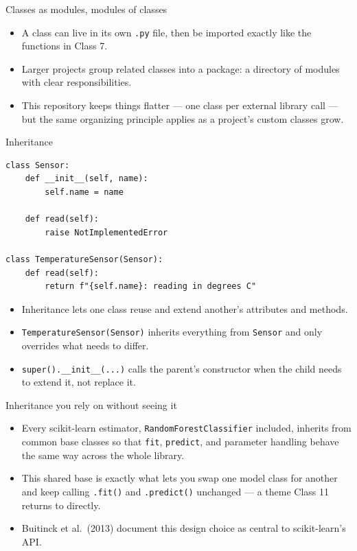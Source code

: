 \begin{frame}{Classes as modules, modules of classes}
\begin{itemize}
\item A class can live in its own \texttt{.py} file, then be imported exactly like the functions in Class 7.
\item Larger projects group related classes into a package: a directory of modules with clear responsibilities.
\item This repository keeps things flatter --- one class per external library call --- but the same organizing principle applies as a project's custom classes grow.
\end{itemize}
\coursefooter
\end{frame}

\begin{frame}[fragile]{Inheritance}
\begin{lstlisting}[style=coursepython]
class Sensor:
    def __init__(self, name):
        self.name = name

    def read(self):
        raise NotImplementedError

class TemperatureSensor(Sensor):
    def read(self):
        return f"{self.name}: reading in degrees C"
\end{lstlisting}
\begin{itemize}
\item Inheritance lets one class reuse and extend another's attributes and methods.
\item \texttt{TemperatureSensor(Sensor)} inherits everything from \texttt{Sensor} and only overrides what needs to differ.
\item \texttt{super().\_\_init\_\_(...)} calls the parent's constructor when the child needs to extend it, not replace it.
\end{itemize}
\coursefooter
\end{frame}

\begin{frame}{Inheritance you rely on without seeing it}
\begin{itemize}
\item Every scikit-learn estimator, \texttt{RandomForestClassifier} included, inherits from common base classes so that \texttt{fit}, \texttt{predict}, and parameter handling behave the same way across the whole library.
\item This shared base is exactly what lets you swap one model class for another and keep calling \texttt{.fit()} and \texttt{.predict()} unchanged --- a theme Class 11 returns to directly.
\item Buitinck et al.\ (2013) document this design choice as central to scikit-learn's API.
\end{itemize}
\coursefooter
\end{frame}

